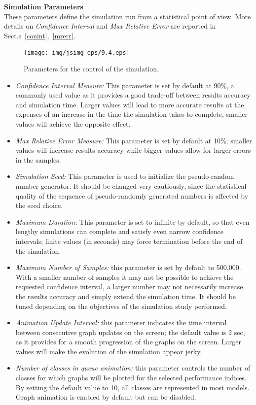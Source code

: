 \noindent \textbf{Simulation Parameters}\\
These parameters define the simulation run from a statistical
point of view. More details on \emph{Confidence Interval} and \emph{Max
Relative
Error} are reported in Sect.s~\ref{conint},~\ref{mrerr}.\\
\begin{figure}[htb]
    \begin{center}
        \texttt{[image: img/jsimg-eps/9.4.eps]}
    \end{center}
    \caption{Parameters for the control of the simulation.}
    \label{fig:simcontr}
\end{figure}
\begin{itemize}
\item \emph{Confidence Interval Measure:} This parameter is set by
default at 90\%, a commonly used value as it provides a good
trade-off between results accuracy and simulation time. Larger
values will lead to more accurate results at the expenses of an
increase in the time the simulation takes to complete, smaller
values will achieve the opposite effect. \item  \emph{Max Relative
Error Measure:} This parameter is set by default at 10\%; smaller
values will increase results accuracy while bigger values allow
for larger errors in the samples. \item \emph{Simulation Seed:}
This parameter is used to initialize the pseudo-random number
generator. It should be changed very cautiously, since the
statistical quality of the sequence of pseudo-randomly generated
numbers is affected by the seed choice. \item \emph{Maximum
Duration:} This parameter is set to infinite by default, so that
even lengthy simulations can complete and satisfy even narrow
confidence intervals; finite values (in seconds) may force
termination before the end of the simulation. \item \emph{Maximum
Number of Samples:} this parameter is set by default to 500,000.
With a smaller number of samples it may not be possible to achieve
the requested confidence interval, a larger number may not
necessarily increase the results accuracy and simply extend the
simulation time. It should be tuned depending on the objectives of
the simulation study performed. \item \emph{Animation Update
Interval:} this parameter indicates the time interval between
consecutive graph updates on the screen; the default value is 2
sec, as it provides for a smooth progression of the graphs on the
screen. Larger values will make the evolution of the simulation
appear jerky. \item \emph{Number of classes in queue animation:}
this parameter controls the number of classes for which graphs
will be plotted for the selected performance indices. By setting
the default value to 10, all classes are represented in most
models. Graph animation is enabled by default but can be disabled.
\end{itemize}

